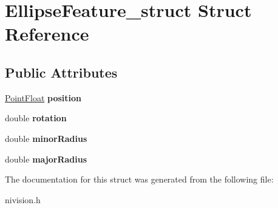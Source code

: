 \hypertarget{structEllipseFeature__struct}{\section{\-Ellipse\-Feature\-\_\-struct \-Struct \-Reference}
\label{structEllipseFeature__struct}
}
\subsection*{\-Public \-Attributes}
\begin{DoxyCompactItemize}
\item 
\hypertarget{structEllipseFeature__struct_a8035288e4c6c786947fbf9c434379f18}{\hyperlink{structPointFloat__struct}{\-Point\-Float} {\bfseries position}}\label{structEllipseFeature__struct_a8035288e4c6c786947fbf9c434379f18}

\item 
\hypertarget{structEllipseFeature__struct_a2eacfab5a1199f073f3d97f8201e5dc8}{double {\bfseries rotation}}\label{structEllipseFeature__struct_a2eacfab5a1199f073f3d97f8201e5dc8}

\item 
\hypertarget{structEllipseFeature__struct_ab46beac6ad0159d5afdd1d5546388930}{double {\bfseries minor\-Radius}}\label{structEllipseFeature__struct_ab46beac6ad0159d5afdd1d5546388930}

\item 
\hypertarget{structEllipseFeature__struct_a4e08343ddfbf396c48d0a20eed7298e8}{double {\bfseries major\-Radius}}\label{structEllipseFeature__struct_a4e08343ddfbf396c48d0a20eed7298e8}

\end{DoxyCompactItemize}


\-The documentation for this struct was generated from the following file\-:\begin{DoxyCompactItemize}
\item 
nivision.\-h\end{DoxyCompactItemize}
